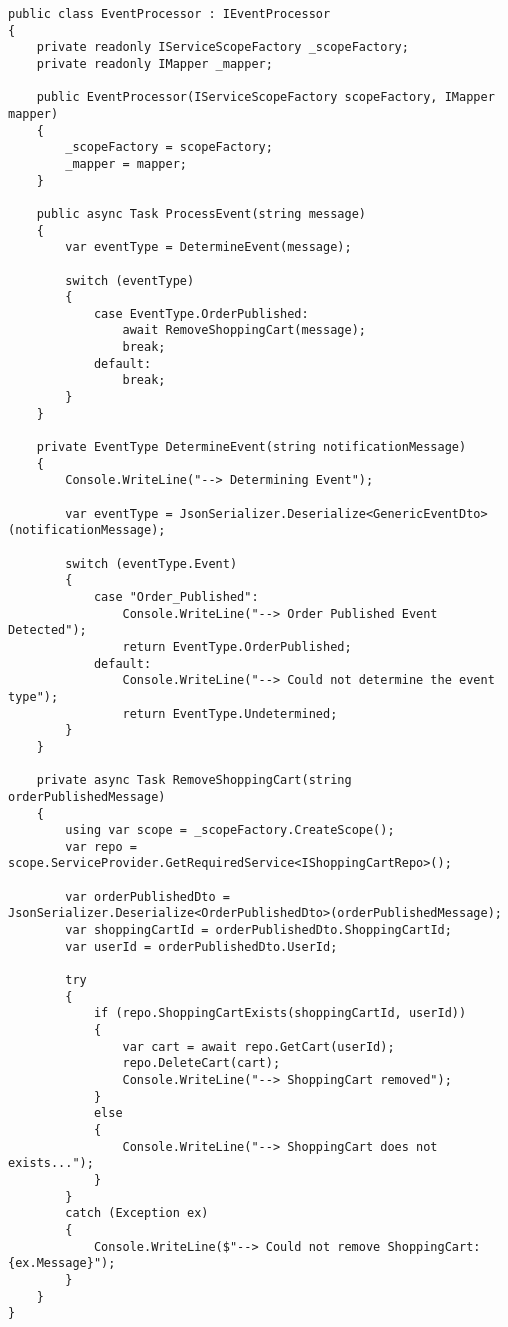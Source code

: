 \begin{lstlisting}[style=mystyleA, caption=EventProcessor.cs (Microservice), label=lst:MicroEventPrc]
public class EventProcessor : IEventProcessor
{
	private readonly IServiceScopeFactory _scopeFactory;
	private readonly IMapper _mapper;
	
	public EventProcessor(IServiceScopeFactory scopeFactory, IMapper mapper)
	{
		_scopeFactory = scopeFactory;
		_mapper = mapper;
	}
	
	public async Task ProcessEvent(string message)
	{
		var eventType = DetermineEvent(message);
		
		switch (eventType)
		{
			case EventType.OrderPublished:
				await RemoveShoppingCart(message);
				break;
			default:
				break;
		}
	}
	
	private EventType DetermineEvent(string notificationMessage)
	{
		Console.WriteLine("--> Determining Event");
		
		var eventType = JsonSerializer.Deserialize<GenericEventDto>(notificationMessage);
		
		switch (eventType.Event)
		{
			case "Order_Published":
				Console.WriteLine("--> Order Published Event Detected");
				return EventType.OrderPublished;
			default:
				Console.WriteLine("--> Could not determine the event type");
				return EventType.Undetermined;
		}
	}
	
	private async Task RemoveShoppingCart(string orderPublishedMessage)
	{
		using var scope = _scopeFactory.CreateScope();
		var repo = scope.ServiceProvider.GetRequiredService<IShoppingCartRepo>();
		
		var orderPublishedDto = JsonSerializer.Deserialize<OrderPublishedDto>(orderPublishedMessage);
		var shoppingCartId = orderPublishedDto.ShoppingCartId;
		var userId = orderPublishedDto.UserId;
		
		try
		{
			if (repo.ShoppingCartExists(shoppingCartId, userId))
			{
				var cart = await repo.GetCart(userId);
				repo.DeleteCart(cart);
				Console.WriteLine("--> ShoppingCart removed");
			}
			else
			{
				Console.WriteLine("--> ShoppingCart does not exists...");
			}
		}
		catch (Exception ex)
		{
			Console.WriteLine($"--> Could not remove ShoppingCart: {ex.Message}");
		}
	}
}
\end{lstlisting}

